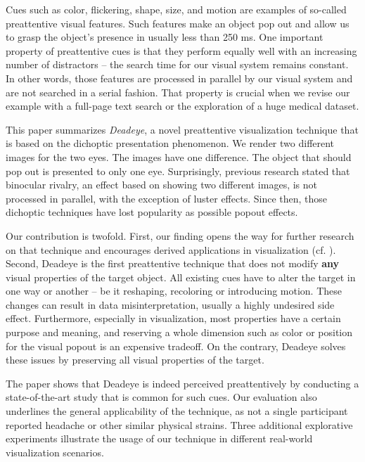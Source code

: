 \documentclass[journal]{vgtc}                %
\begin{document}
Cues such as color, flickering, shape, size, and motion are examples of so-called preattentive visual features. Such features make an object pop out and allow us to grasp the object's presence in usually less than 250 ms. One important property of preattentive cues is that they perform equally well with an increasing number of distractors -- the search time for our visual system remains constant. In other words, those features are processed in parallel by our visual system and are not searched in a serial fashion. That property is crucial when we revise our example with a full-page text search or the exploration of a huge medical dataset.


This paper summarizes \textit{Deadeye}, a novel preattentive visualization technique that is based on the dichoptic presentation phenomenon. We render two different images for the two eyes. The images have one difference. The object that should pop out is presented to only one eye. Surprisingly, previous research stated that binocular rivalry, an effect based on showing two different images, is not processed in parallel, with the exception of luster effects. Since then, those dichoptic techniques have lost popularity as possible popout effects. 

Our contribution is twofold. First, our finding opens the way for further research on that technique and encourages derived applications in visualization (cf. ). Second, Deadeye is the first preattentive technique that does not modify \textbf{any} visual properties of the target object. All existing cues have to alter the target in one way or another -- be it reshaping, recoloring or introducing motion. These changes can result in data misinterpretation, usually a highly undesired side effect. Furthermore, especially in visualization, most properties have a certain purpose and meaning, and reserving a whole dimension such as color or position for the visual popout is an expensive tradeoff. On the contrary, Deadeye solves these issues by preserving all visual properties of the target. 


The paper shows that Deadeye is indeed perceived preattentively by conducting a state-of-the-art study that is common for such cues. Our evaluation also underlines the general applicability of the technique, as not a single participant reported headache or other similar physical strains. Three additional explorative experiments illustrate the usage of our technique in different real-world visualization scenarios.
\end{document}
